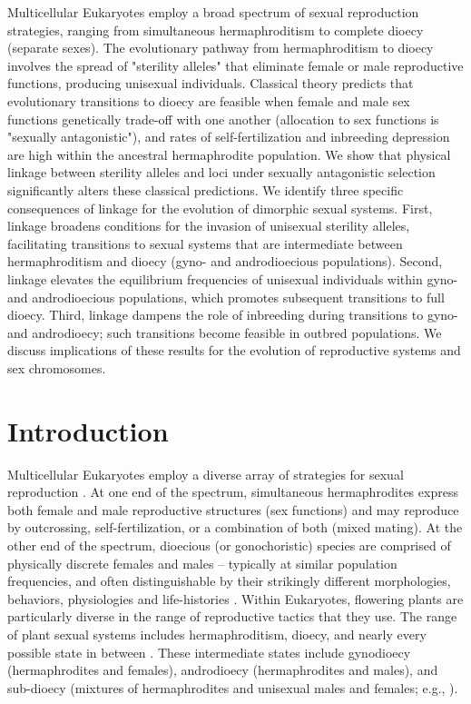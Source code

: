 \documentclass{article}
\begin{document}
\noindent{} Multicellular Eukaryotes employ a broad spectrum of sexual reproduction strategies, ranging from simultaneous hermaphroditism to complete dioecy (separate sexes). The evolutionary pathway from hermaphroditism to dioecy involves the spread of "sterility alleles" that eliminate female or male reproductive functions, producing unisexual individuals. Classical theory predicts that evolutionary transitions to dioecy are feasible when female and male sex functions genetically trade-off with one another (allocation to sex functions is "sexually antagonistic"), and rates of self-fertilization and inbreeding depression are high within the ancestral hermaphrodite population. We show that physical linkage between sterility alleles and loci under sexually antagonistic selection significantly alters these classical predictions. We identify three specific consequences of linkage for the evolution of dimorphic sexual systems. First, linkage broadens conditions for the invasion of unisexual sterility alleles, facilitating transitions to sexual systems that are intermediate between hermaphroditism and dioecy (gyno- and androdioecious populations). Second, linkage elevates the equilibrium frequencies of unisexual individuals within gyno- and androdioecious populations, which promotes subsequent transitions to full dioecy. Third, linkage dampens the role of inbreeding during transitions to gyno- and androdioecy; such transitions become feasible in outbred populations. We discuss implications of these results for the evolution of reproductive systems and sex chromosomes.
\newpage{}


\section*{Introduction}
Multicellular Eukaryotes employ a diverse array of strategies for sexual reproduction \citep{Bachtrog2014}. At one end of the spectrum, simultaneous hermaphrodites express both female and male reproductive structures (sex functions) and may reproduce by outcrossing, self-fertilization, or a combination of both (mixed mating). At the other end of the spectrum, dioecious (or gonochoristic) species are comprised of physically discrete females and males -- typically at similar population frequencies, and often distinguishable by their strikingly different morphologies, behaviors, physiologies and life-histories \citep{Andersson1994}. Within Eukaryotes, flowering plants are particularly diverse in the range of reproductive tactics that they use. The range of plant sexual systems includes hermaphroditism, dioecy, and nearly every possible state in between \citep{Darwin1877, Westergaard1958, Bawa1980, SakaiWeller1999, Bachtrog2014}. These intermediate states include gynodioecy (hermaphrodites and females), androdioecy (hermaphrodites and males), and sub-dioecy (mixtures of hermaphrodites and unisexual males and females; e.g., \citealt{SakaiWeller1999, Renner2014}). 
\end{document}
